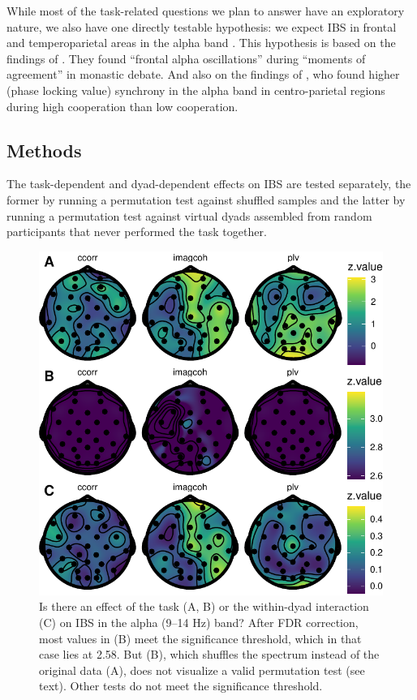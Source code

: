 While most of the task-related questions we plan to answer have an exploratory
nature, we also have one directly testable hypothesis: we expect IBS in frontal
and temperoparietal areas in the alpha band \parencite{newman_effects_2021}.
This hypothesis is based on the findings of
\textcite{van_vugt_inter-brain_2020}. They found ``frontal alpha oscillations''
during ``moments of agreement'' in monastic debate. And also on the findings of
\textcite{hu_inter-brain_2018}, who found higher (phase locking value) synchrony
in the alpha band in centro-parietal regions during high cooperation than low
cooperation.

\subsection{Methods}

The task-dependent and dyad-dependent effects on IBS are tested separately,
the former by running a permutation test against shuffled samples and the latter
by running a permutation test against virtual dyads assembled from random
participants that never performed the task together.

\begin{figure}[!htpb]
  \includegraphics[width=\linewidth]{../stats/results/permutation_alpha.pdf}
  \caption{Is there an effect of the task (A, B) or the within-dyad interaction (C) on IBS in the alpha (9--14 Hz) band? After FDR correction, most values in (B) meet the significance threshold, which in that case lies at 2.58. But (B), which shuffles the spectrum instead of the original data (A), does not visualize a valid permutation test (see text). Other tests do not meet the significance threshold.}
  \label{fig:permutation_alpha}
\end{figure}

